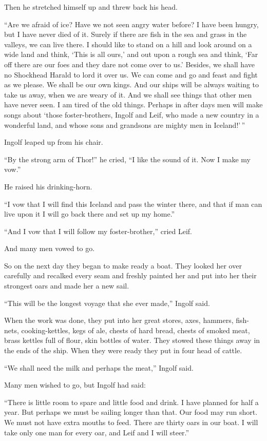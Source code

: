 Then he stretched himself up and threw back his head.

``Are we afraid of ice? Have we not seen angry water before? I have been
hungry, but I have never died of it. Surely if there are fish in the sea
and grass in the valleys, we can live there. I should like to stand on a
hill and look around on a wide land and think, `This is all ours,' and
out upon a rough sea and think, `Far off there are our foes and they
dare not come over to us.' Besides, we shall have no Shockhead Harald to
lord it over us. We can come and go and feast and fight as we please. We
shall be our own kings. And our ships will be always waiting to take us
away, when we are weary of it. And we shall see things that other men
have never seen. I am tired of the old things. Perhaps in after days men
will make songs about `those foster-brothers, Ingolf and Leif, who made
a new country in a wonderful land, and whose sons and grandsons are
mighty men in Iceland!'\,''

Ingolf leaped up from his chair.

``By the strong arm of Thor!'' he cried, ``I like the sound of it. Now I
make my vow.''

He raised his drinking-horn.

``I vow that I will find this Iceland and pass the winter there, and
that if man can live upon it I will go back there and set up my home.''

``And I vow that I will follow my foster-brother,'' cried Leif.

And many men vowed to go.

So on the next day they began to make ready a boat. They looked her over
carefully and recalked every seam and freshly painted her and put into
her their strongest oars and made her a new sail.

``This will be the longest voyage that she ever made,'' Ingolf said.

When the work was done, they put into her great stores, axes, hammers,
fish-nets, cooking-kettles, kegs of ale, chests of hard bread, chests of
smoked meat, brass kettles full of flour, skin bottles of water. They
stowed these things away in the ends of the ship. When they were ready
they put in four head of cattle.

``We shall need the milk and perhaps the meat,'' Ingolf said.

Many men wished to go, but Ingolf had said:

``There is little room to spare and little food and drink. I have
planned for half a year. But perhaps we must be sailing longer than
that. Our food may run short. We must not have extra mouths to feed.
There are thirty oars in our boat. I will take only one man for every
oar, and Leif and I will steer.''

